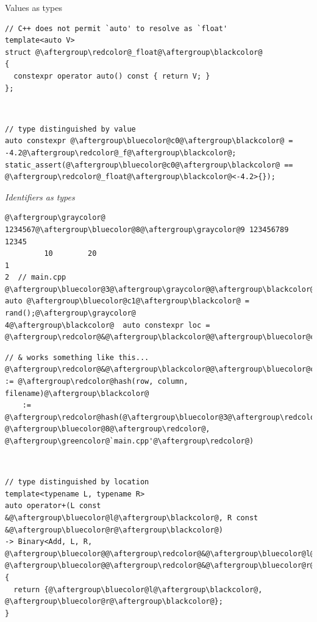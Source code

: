 \documentclass[xcolor=dvipsnames]{beamer}
\begin{document}
\begin{frame}[fragile]{Values as types}
\begin{lstlisting}
// C++ does not permit `auto' to resolve as `float'
template<auto V>
struct @\aftergroup\redcolor@_float@\aftergroup\blackcolor@
{
  constexpr operator auto() const { return V; }
};
\end{lstlisting}

~

\begin{lstlisting}
// type distinguished by value
auto constexpr @\aftergroup\bluecolor@c0@\aftergroup\blackcolor@ = -4.2@\aftergroup\redcolor@_f@\aftergroup\blackcolor@;
static_assert(@\aftergroup\bluecolor@c0@\aftergroup\blackcolor@ == @\aftergroup\redcolor@_float@\aftergroup\blackcolor@<-4.2>{});
\end{lstlisting}
\end{frame}



\begin{frame}[fragile]{\emph{Identifiers as types}}
\begin{lstlisting}
@\aftergroup\graycolor@ 1234567@\aftergroup\bluecolor@8@\aftergroup\graycolor@9 123456789 12345
         10        20
1
2  // main.cpp
@\aftergroup\bluecolor@3@\aftergroup\graycolor@@\aftergroup\blackcolor@  auto @\aftergroup\bluecolor@c1@\aftergroup\blackcolor@ = rand();@\aftergroup\graycolor@
4@\aftergroup\blackcolor@  auto constexpr loc = @\aftergroup\redcolor@&@\aftergroup\blackcolor@@\aftergroup\bluecolor@c1@\aftergroup\blackcolor@@\aftergroup\redcolor@@\aftergroup\blackcolor@;@\aftergroup\graycolor@
\end{lstlisting}


\begin{lstlisting}
// & works something like this...
@\aftergroup\redcolor@&@\aftergroup\blackcolor@@\aftergroup\bluecolor@c1@\aftergroup\blackcolor@@\aftergroup\redcolor@@\aftergroup\blackcolor@ := @\aftergroup\redcolor@hash(row, column, filename)@\aftergroup\blackcolor@
    := @\aftergroup\redcolor@hash(@\aftergroup\bluecolor@3@\aftergroup\redcolor@, @\aftergroup\bluecolor@8@\aftergroup\redcolor@, @\aftergroup\greencolor@`main.cpp'@\aftergroup\redcolor@)
\end{lstlisting}

~

\begin{lstlisting}
// type distinguished by location
template<typename L, typename R>
auto operator+(L const &@\aftergroup\bluecolor@l@\aftergroup\blackcolor@, R const &@\aftergroup\bluecolor@r@\aftergroup\blackcolor@)
-> Binary<Add, L, R, @\aftergroup\bluecolor@@\aftergroup\redcolor@&@\aftergroup\bluecolor@l@\aftergroup\blackcolor@, @\aftergroup\bluecolor@@\aftergroup\redcolor@&@\aftergroup\bluecolor@r@\aftergroup\blackcolor@>
{
  return {@\aftergroup\bluecolor@l@\aftergroup\blackcolor@, @\aftergroup\bluecolor@r@\aftergroup\blackcolor@};
}
\end{lstlisting}
\end{frame}
\end{document}
